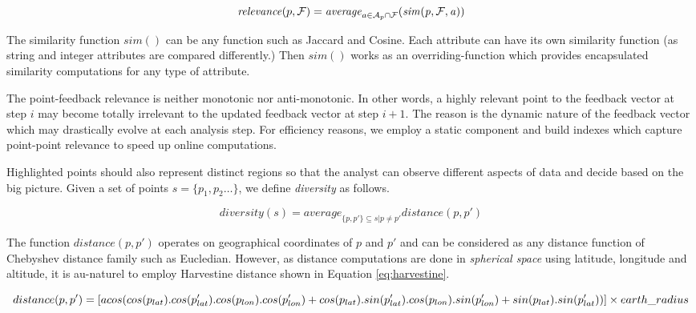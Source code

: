 \documentclass{vldb}
\begin{document}
\begin{dmath}
\label{eq:rel}
\mathit{relevance}(p,{\cal F}) = \mathit{average}_{a \in {\cal A}_{p} \cap {\cal F}}(\mathit{sim(p, {\cal F}, a)})
\end{dmath}

The similarity function $\mathit{sim}()$ can be any function such as Jaccard and Cosine. Each attribute can have its own similarity function (as string and integer attributes are compared differently.) Then $\mathit{sim}()$ works as an overriding-function which provides encapsulated similarity computations for any type of attribute.

The point-feedback relevance is neither monotonic nor anti-monotonic. In other words, a highly relevant point to the feedback vector at step $i$ may become totally irrelevant to the updated feedback vector at step $i+1$. The reason is the dynamic nature of the feedback vector which may drastically evolve at each analysis step. For efficiency reasons, we employ a static component and build indexes which capture point-point relevance to speed up online computations.

\vspace{5pt}
 Highlighted points should also represent distinct regions so that the analyst can observe different aspects of data and decide based on the big picture. Given a set of points $s = \{ p_1, p_2 \dots \}$, we define {\em diversity} as follows.

\begin{dmath}
\label{eq:divs}
\mathit{diversity}(s) = \mathit{average}_{\{p, p'\} \subseteq s | p \neq p' } \mathit{distance}(p,p')
\end{dmath} 

The function $\mathit{distance}(p,p')$ operates on geographical coordinates of $p$ and $p'$ and can be considered as any distance function of Chebyshev distance family such as Eucledian. However, as distance computations are done in {\em spherical space} using latitude, longitude and altitude, it is au-naturel to employ Harvestine distance shown in Equation \ref{eq:harvestine}.

\begin{dmath}
\label{eq:harvestine}
distance(p,p') = [ acos(cos(p_{lat}) . cos(p'_{lat}) . cos(p_{lon}) . cos(p'_{lon})\\ + cos(p_{lat}) . sin(p'_{lat}). cos(p_{lon}) . sin(p'_{lon}) + sin(p_{lat}) . sin(p'_{lat})) ] \times earth\_radius
\end{dmath}
\end{document}
